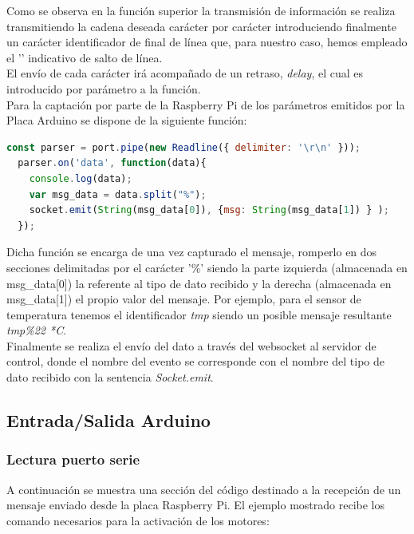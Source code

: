 Como se observa en la función superior la transmisión de información se realiza transmitiendo la cadena deseada carácter por carácter introduciendo finalmente un carácter identificador de final de línea que,
para nuestro caso, hemos empleado el '\n' indicativo de salto de línea.\\

El envío de cada carácter irá acompañado de un retraso, \emph{delay}, el cual es introducido por parámetro a la función.\\

Para la captación por parte de la Raspberry Pi de los parámetros emitidos por la Placa Arduino se dispone de la siguiente función:\\

\begin{lstlisting}[language=JavaScript]
  const parser = port.pipe(new Readline({ delimiter: '\r\n' }));
  parser.on('data', function(data){
    console.log(data);
    var msg_data = data.split("%");
    socket.emit(String(msg_data[0]), {msg: String(msg_data[1]) } );
  });

\end{lstlisting}

Dicha función se encarga de una vez capturado el mensaje, romperlo en dos secciones delimitadas por el carácter '\%' siendo la parte izquierda (almacenada en msg\_data[0]) 
la referente al tipo de dato recibido y la derecha (almacenada en msg\_data[1]) el propio valor del mensaje. Por ejemplo, para el sensor de temperatura tenemos el identificador \emph{tmp} 
siendo un posible mensaje resultante \emph{tmp\%22 *C}.\\

Finalmente se realiza el envío del dato a través del websocket al servidor de control, donde el nombre del evento se corresponde con el nombre del tipo de dato recibido con la sentencia \emph{Socket.emit}.\\

\subsection{Entrada/Salida Arduino}

\subsubsection{Lectura puerto serie}

A continuación se muestra una sección del código destinado a la recepción de un mensaje enviado desde la placa Raspberry Pi. El ejemplo mostrado recibe los comando necesarios para
la activación de los motores:\\

